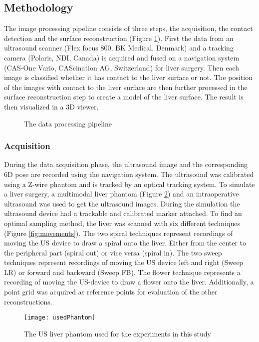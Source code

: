 \subsection{Methodology}
The image processing pipeline consists of three steps, the acquisition, the
contact detection and the surface reconstruction (Figure \ref{fig:processingPipeline}). First the data from an
ultrasound scanner (Flex focus 800, BK Medical, Denmark) and a tracking camera
(Polaris, NDI, Canada) is acquired and fused on a navigation system (CAS-One
Vario, CAScination AG, Switzerland) for liver surgery. Then each image is
classified whether it has contact to the liver surface or not. The position of
the images with contact to the liver surface are then further processed in the
surface reconstruction step to create a model of the liver surface. The result
is then visualized in a 3D viewer.
\begin{figure}[H]
  \centering
  \caption{The data processing pipeline}
  \label{fig:processingPipeline}
\end{figure}

\subsubsection{Acquisition}
During the data acquisition phase, the ultrasound image and the corresponding 6D
pose are recorded using the navigation system. The ultrasound was calibrated
using a Z-wire phantom \cite{peterhans2010fully} and is tracked by an optical tracking system. To
simulate a liver surgery, a multimodal liver phantom (Figure \ref{fig:usedPhantom}) and an
intraoperative ultrasound was used to get the ultrasound images. During the
simulation the ultrasound device had a trackable and calibrated marker attached.
To find an optimal sampling method, the liver was scanned with six different
techniques (Figure \ref{fig:movements}). The two spiral techniques represent recordings
of moving the US device to draw a spiral onto the liver. Either from the center
to the peripheral part (spiral out) or vice versa (spiral in). The two sweep
techniques represent recordings of moving the US device left and right (Sweep
LR) or forward and backward (Sweep FB). The flower technique represents a
recording of moving the US-device to draw a flower onto the liver.
Additionally, a point grid was acquired as reference points for evaluation of
the other reconstructions.

\begin{figure}[H]
  \centering
 \texttt{[image: usedPhantom]}
 \caption{The US liver phantom used for the experiments in this study}
  \label{fig:usedPhantom}
\end{figure}

